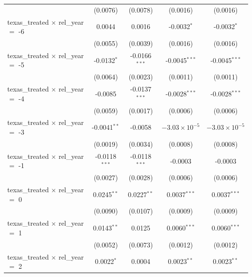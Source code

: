 \begin{tabular}{lcccc}
                                                & (0.0076)        & (0.0078)            & (0.0016)               & (0.0016)\\   
   texas\_treated $\times$ rel\_year $=$ -6     & 0.0044          & 0.0016              & -0.0032$^{*}$          & -0.0032$^{*}$\\   
                                                & (0.0055)        & (0.0039)            & (0.0016)               & (0.0016)\\   
   texas\_treated $\times$ rel\_year $=$ -5     & -0.0132$^{*}$   & -0.0166$^{***}$     & -0.0045$^{***}$        & -0.0045$^{***}$\\   
                                                & (0.0064)        & (0.0023)            & (0.0011)               & (0.0011)\\   
   texas\_treated $\times$ rel\_year $=$ -4     & -0.0085         & -0.0137$^{***}$     & -0.0028$^{***}$        & -0.0028$^{***}$\\   
                                                & (0.0059)        & (0.0017)            & (0.0006)               & (0.0006)\\   
   texas\_treated $\times$ rel\_year $=$ -3     & -0.0041$^{**}$  & -0.0058             & $-3.03\times 10^{-5}$  & $-3.03\times 10^{-5}$\\    
                                                & (0.0019)        & (0.0034)            & (0.0008)               & (0.0008)\\   
   texas\_treated $\times$ rel\_year $=$ -1     & -0.0118$^{***}$ & -0.0118$^{***}$     & -0.0003                & -0.0003\\   
                                                & (0.0027)        & (0.0028)            & (0.0006)               & (0.0006)\\   
   texas\_treated $\times$ rel\_year $=$ 0      & 0.0245$^{**}$   & 0.0227$^{**}$       & 0.0037$^{***}$         & 0.0037$^{***}$\\   
                                                & (0.0090)        & (0.0107)            & (0.0009)               & (0.0009)\\   
   texas\_treated $\times$ rel\_year $=$ 1      & 0.0143$^{**}$   & 0.0125              & 0.0060$^{***}$         & 0.0060$^{***}$\\   
                                                & (0.0052)        & (0.0073)            & (0.0012)               & (0.0012)\\   
   texas\_treated $\times$ rel\_year $=$ 2      & 0.0022$^{*}$    & 0.0004              & 0.0023$^{**}$          & 0.0023$^{**}$\\   

\end{tabular}
